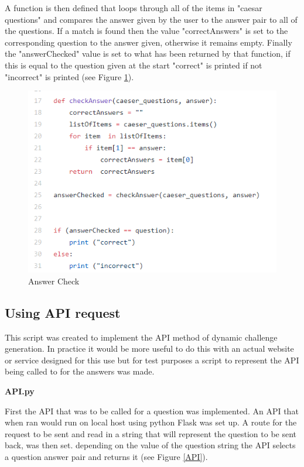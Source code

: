 \documentclass[12pt,a4paper]{article}
\begin{document}
A function is then defined that loops through all of the items in "caesar questions" and compares the answer given by the user to the answer pair to all of the questions. If a match is found then the value "correctAnswers" is set to the corresponding question to the answer given, otherwise it remains empty. Finally the "answerChecked" value is set to what has been returned by that function, if this is equal to the question given at the start "correct" is printed if not "incorrect" is printed (see Figure \ref{Random2}).

\begin{figure}[!ht]
    \centering
    \includegraphics[width=1.0\textwidth]{Figs/random2.PNG} 
    \caption{Answer Check} 
    \label{Random2}
\end{figure} 


\subsection{Using API request}   

This script was created to implement the API method of dynamic challenge generation. In practice it would be more useful to do this with an actual website or service designed for this use but for test purposes a script to represent the API being called to for the answers was made.  

\textbf{API.py}    

First the API that was to be called for a question was implemented. An API that when ran would run on local host using python Flask was set up. A route for the request to be sent and read in a string that will represent the question to be sent back, was then set. depending on the value of the question string the API selects a question answer pair and returns it (see Figure \ref{API}).
\end{document}

